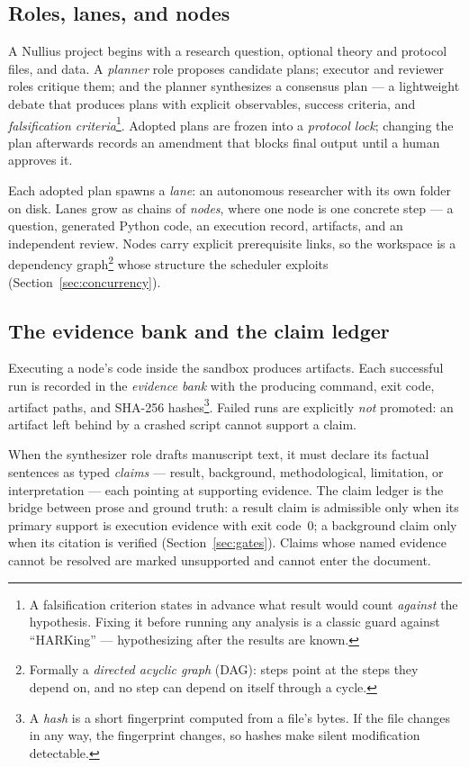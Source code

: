\documentclass[11pt]{article}
\begin{document}
\subsection{Roles, lanes, and nodes}

A Nullius project begins with a research question, optional theory and protocol files, and data. A \emph{planner} role proposes candidate plans; executor and reviewer roles critique them; and the planner synthesizes a consensus plan --- a lightweight debate that produces plans with explicit observables, success criteria, and \emph{falsification criteria}\footnote{A falsification criterion states in advance what result would count \emph{against} the hypothesis. Fixing it before running any analysis is a classic guard against ``HARKing'' --- hypothesizing after the results are known.}. Adopted plans are frozen into a \emph{protocol lock}; changing the plan afterwards records an amendment that blocks final output until a human approves it.

Each adopted plan spawns a \emph{lane}: an autonomous researcher with its own folder on disk. Lanes grow as chains of \emph{nodes}, where one node is one concrete step --- a question, generated Python code, an execution record, artifacts, and an independent review. Nodes carry explicit prerequisite links, so the workspace is a dependency graph\footnote{Formally a \emph{directed acyclic graph} (DAG): steps point at the steps they depend on, and no step can depend on itself through a cycle.} whose structure the scheduler exploits (Section~\ref{sec:concurrency}).

\subsection{The evidence bank and the claim ledger}

Executing a node's code inside the sandbox produces artifacts. Each successful run is recorded in the \emph{evidence bank} with the producing command, exit code, artifact paths, and SHA-256 hashes\footnote{A \emph{hash} is a short fingerprint computed from a file's bytes. If the file changes in any way, the fingerprint changes, so hashes make silent modification detectable.}. Failed runs are explicitly \emph{not} promoted: an artifact left behind by a crashed script cannot support a claim.

When the synthesizer role drafts manuscript text, it must declare its factual sentences as typed \emph{claims} --- result, background, methodological, limitation, or interpretation --- each pointing at supporting evidence. The claim ledger is the bridge between prose and ground truth: a result claim is admissible only when its primary support is execution evidence with exit code~0; a background claim only when its citation is verified (Section~\ref{sec:gates}). Claims whose named evidence cannot be resolved are marked unsupported and cannot enter the document.
\end{document}
